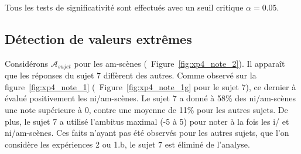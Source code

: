 Tous les tests de significativité sont effectués avec un seuil critique $\alpha=0.05$.

\subsection{Détection de valeurs extrêmes}

Considérons $\mathcal{A}_{sujet}$ pour les am-scènes (\cf~Figure~\ref{fig:xp4_note_2}). Il apparaît que les réponses du sujet 7 diffèrent des autres. Comme observé sur la figure~\ref{fig:xp4_note_1} (\cf~Figure~\ref{fig:xp4_note_1g} pour le sujet 7), ce dernier à évalué positivement les ni/am-scènes. Le sujet 7 a donné à 58\% des ni/am-scènes une note supérieure à 0,  contre une moyenne de 11\% pour les autres sujets. De plus, le sujet 7 a utilisé l'ambitus maximal (-5 à 5) pour noter à la fois les i/ et ni/am-scènes. Ces faits n'ayant pas été observés pour les autres sujets, que l'on considère les expériences 2 ou 1.b, le sujet 7 est éliminé de l'analyse. 

